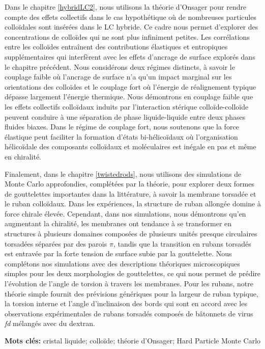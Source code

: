 Dans le chapitre \ref{hybridLC2}, nous utilisons la théorie d'Onsager pour rendre compte des effets collectifs dans le cas hypothétique où de nombreuses particules colloïdales sont insérées dans le LC hybride. Ce cadre nous permet d'explorer des concentrations de colloïdes qui ne sont plus infiniment petites. Les corrélations entre les colloïdes entraînent des contributions élastiques et entropiques supplémentaires qui interfèrent avec les effets d'ancrage de surface explorés dans le chapitre précédent. Nous considérons deux régimes distincts, à savoir le couplage faible où l'ancrage de surface n'a qu'un impact marginal sur les orientations des colloïdes et le couplage fort où l'énergie de réalignement typique dépasse largement l'énergie thermique. Nous démontrons en couplage faible que les effets collectifs colloïdaux induits par l'interaction stérique colloïde-colloïde peuvent conduire à une séparation de phase liquide-liquide entre deux phases fluides biaxes. Dans le régime de couplage fort, nous soutenons que la force élastique peut faciliter la formation d'états bi-hélicoïdaux où l'organisation hélicoïdale des composants colloïdaux et moléculaires est inégale en pas et même en chiralité.

Finalement, dans le chapitre \ref{twistedrods}, nous utilisons des simulations de Monte Carlo approfondies, complétées par la théorie, pour explorer deux formes de gouttelettes importantes dans la littérature, à savoir la membrane torsadée et le ruban colloïdaux. Dans les expériences, la structure de ruban allongée domine à force chirale élevée. Cependant, dans nos simulations, nous démontrons qu'en augmentant la chiralité, les membranes ont tendance à se transformer en structures à plusieurs domaines composées de plusieurs unités presque circulaires torsadées séparées par des parois $\pi$, tandis que la transition en rubans torsadés est entravée par la forte tension de surface subie par la gouttelette. Nous complétons nos simulations avec des descriptions théoriques microscopiques simples pour les deux morphologies de gouttelettes, ce qui nous permet de prédire l'évolution de l'angle de torsion à travers les membranes. Pour les rubans, notre théorie simple fournit des prévisions génériques pour la largeur de ruban typique, la torsion interne et l'angle d'inclinaison des bords qui sont en accord avec les observations expérimentales de rubans torsadés composés de bâtonnets de virus {\em fd} mélangés avec du dextran.

{\large\textbf{Mots clés:}} cristal liquide; colloïde; théorie d'Onsager; Hard Particle Monte Carlo